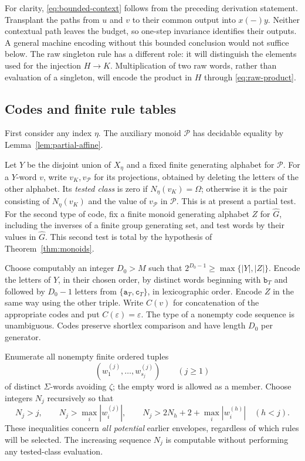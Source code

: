 For clarity, \eqref{eq:bounded-context} follows from the preceding
derivation statement.  Transplant the paths from $u$ and $v$ to their
common output into $x(-)y$.  Neither contextual path leaves the budget,
so one-step invariance identifies their outputs.  A general machine
encoding without this bounded conclusion would not suffice below.
The raw singleton rule has a different role: it will distinguish the
elements used for the injection $H\to K$. Multiplication of two raw
words, rather than evaluation of a singleton, will encode the product
in $H$ through \eqref{eq:raw-product}.

\subsection{Codes and finite rule tables}

First consider any index $\eta$.  The auxiliary monoid $\mathcal P$
has decidable equality by Lemma~\ref{lem:partial-affine}.

Let $Y$ be the disjoint union of $X_\eta$ and a fixed finite generating
alphabet for $\mathcal P$.  For a $Y$-word $v$, write $v_K,v_{\mathcal P}$
for its projections, obtained by deleting the letters of the other
alphabet.  Its \emph{tested class} is zero if $N_\eta(v_K)=\Omega$;
otherwise it is the pair consisting of $N_\eta(v_K)$ and the value of
$v_{\mathcal P}$ in $\mathcal P$.  This is at present a partial test.
For the second type of code, fix a finite monoid generating alphabet
$Z$ for $\widehat G$, including the inverses of a finite group
generating set, and test words by their values in $\widehat G$.
This second test is total by the hypothesis of Theorem~\ref{thm:monoids}.

Choose computably an integer $D_0>M$ such that
$2^{D_0-1}\ge\max\{|Y|,|Z|\}$.  Encode the letters of $Y$, in their
chosen order, by distinct words beginning with $\mathtt b_T$ and
followed by $D_0-1$ letters from
$\{\mathtt a_T,\mathtt c_T\}$, in lexicographic order.  Encode $Z$
in the same way using the other triple.  Write $C(v)$ for concatenation
of the appropriate codes and put $C(\varepsilon)=\varepsilon$.
The type of a nonempty code sequence is unambiguous.  Codes preserve
shortlex comparison and have length $D_0$ per generator.

Enumerate all nonempty finite ordered tuples
\[
 (w_1^{(j)},\ldots,w_{s_j}^{(j)})\qquad(j\ge1)
\]
of distinct $\Sigma$-words avoiding $\zeta$; the empty word is allowed
as a member.  Choose integers $N_j$ recursively so that
\begin{equation}\label{eq:envelope-spacing}
 N_j>j,\qquad N_j>\max_i|w_i^{(j)}|,\qquad
 N_j>2N_h+2+\max_i|w_i^{(h)}|\quad(h<j).
\end{equation}
These inequalities concern \emph{all potential} earlier envelopes,
regardless of which rules will be selected.  The increasing sequence
$N_j$ is computable without performing any tested-class evaluation.


